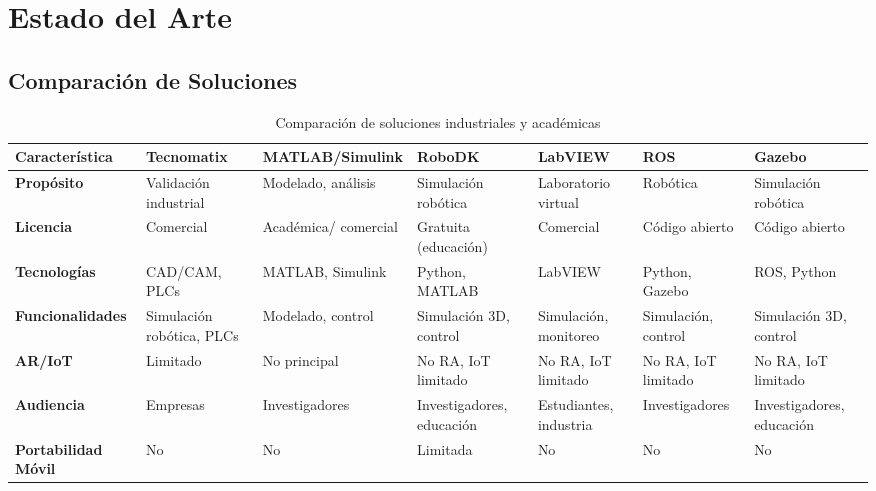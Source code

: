 \documentclass[12pt,letterpaper]{report}
\begin{document}
	\section{Estado del Arte}
	
	\subsection{Comparación de Soluciones}
	\begin{table}[H]
		\centering
		\caption{Comparación de soluciones industriales y académicas}
		\label{tab:comparacion_plataformas_industrial}
		\scriptsize
		\begin{tabular}{|>{\centering\arraybackslash}p{2.2cm}|>{\centering\arraybackslash}p{2.4cm}|>{\centering\arraybackslash}p{2.4cm}|>{\centering\arraybackslash}p{2.0cm}|>{\centering\arraybackslash}p{2.0cm}|>{\centering\arraybackslash}p{1.8cm}|>{\centering\arraybackslash}p{2.0cm}|}
			\hline
			\textbf{Característica} & \textbf{Tecnomatix} & \textbf{MATLAB/Simulink} & \textbf{RoboDK} & \textbf{LabVIEW} & \textbf{ROS} & \textbf{Gazebo} \\
			\hline
			\textbf{Propósito} & Validación industrial & Modelado, análisis & Simulación robótica & Laboratorio virtual & Robótica & Simulación robótica \\
			\hline
			\textbf{Licencia} & Comercial & Académica/ comercial & Gratuita (educación) & Comercial & Código abierto & Código abierto \\
			\hline
			\textbf{Tecnologías} & CAD/CAM, PLCs & MATLAB, Simulink & Python, MATLAB & LabVIEW & Python, Gazebo & ROS, Python \\
			\hline
			\textbf{Funcionalidades} & Simulación robótica, PLCs & Modelado, control & Simulación 3D, control & Simulación, monitoreo & Simulación, control & Simulación 3D, control \\
			\hline
			\textbf{AR/IoT} & Limitado & No principal & No RA, IoT limitado & No RA, IoT limitado & No RA, IoT limitado & No RA, IoT limitado \\
			\hline
			\textbf{Audiencia} & Empresas & Investigadores & Investigadores, educación & Estudiantes, industria & Investigadores & Investigadores, educación \\
			\hline
			\textbf{Portabilidad Móvil} & No & No & Limitada & No & No & No \\
			\hline
		\end{tabular}
	\end{table}
	
\end{document}
